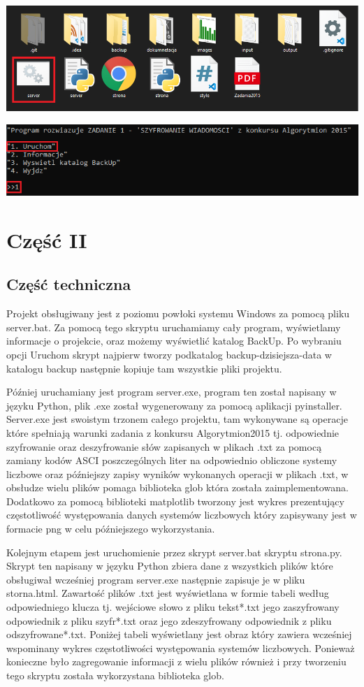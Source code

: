 \documentclass[12pt,a4paper]{article}
\begin{document}
			\includegraphics[scale=0.7]{instrukcja}

			\includegraphics[scale=0.8]{instrukcja2}
	
	
\newpage
	\section*{Część II}
	\subsection*{Część techniczna}
Projekt obsługiwany jest z poziomu powłoki systemu Windows za pomocą pliku server.bat. Za pomocą tego skryptu uruchamiamy cały program, wyświetlamy informacje o projekcie, oraz możemy wyświetlić katalog BackUp. Po wybraniu opcji Uruchom skrypt najpierw tworzy podkatalog backup-dzisiejsza-data w katalogu backup następnie kopiuje tam wszystkie pliki projektu. 


Później uruchamiany jest program server.exe, program ten został napisany w języku Python, plik .exe został wygenerowany za pomocą  aplikacji pyinstaller. Server.exe jest swoistym trzonem całego projektu, tam wykonywane są operacje które spełniają warunki zadania z konkursu Algorytmion2015 tj. odpowiednie szyfrowanie oraz deszyfrowanie słów zapisanych w plikach .txt za pomocą zamiany kodów ASCI poszczególnych liter na odpowiednio obliczone systemy liczbowe oraz późniejszy zapisy wyników wykonanych operacji w plikach .txt, w obsłudze wielu plików pomaga biblioteka glob która została zaimplementowana. Dodatkowo za pomocą biblioteki matplotlib tworzony jest wykres prezentujący  częstotliwość występowania danych systemów liczbowych który zapisywany jest w formacie png w celu późniejszego wykorzystania.

Kolejnym etapem jest uruchomienie przez skrypt server.bat skryptu strona.py. Skrypt ten napisany w języku Python zbiera dane z wszystkich plików które obsługiwał wcześniej program server.exe następnie zapisuje je w pliku storna.html. Zawartość plików .txt jest wyświetlana w formie tabeli według odpowiedniego klucza tj. wejściowe słowo z pliku tekst*.txt jego zaszyfrowany odpowiednik z pliku szyfr*.txt oraz jego zdeszyfrowany odpowiednik z pliku odszyfrowane*.txt. Poniżej tabeli wyświetlany jest obraz który zawiera wcześniej wspominany wykres częstotliwości występowania systemów liczbowych. Ponieważ konieczne było zagregowanie informacji z wielu plików również i przy tworzeniu tego skryptu została wykorzystana biblioteka glob. 
\end{document}
